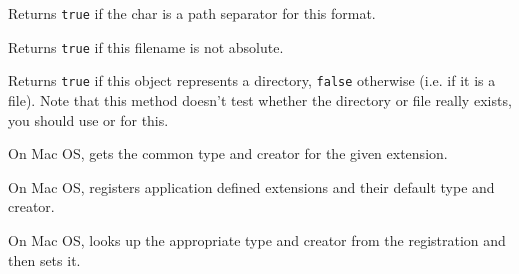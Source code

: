 \label{wxfilenameispathseparator}


Returns {\tt true} if the char is a path separator for this format.


\label{wxfilenameisrelative}


Returns {\tt true} if this filename is not absolute.


\label{wxfilenameisdir}


Returns {\tt true} if this object represents a directory, {\tt false} otherwise
(i.e. if it is a file). Note that this method doesn't test whether the
directory or file really exists, you should use 
 or 
 for this.

\label{wxfilenamemacfinddefaulttypeandcreator}


On Mac OS, gets the common type and creator for the given extension.

\label{wxfilenamemacregisterdefaulttypeandcreator}


On Mac OS, registers application defined extensions and their default type and creator.

\label{wxfilenamemacsetdefaulttypeandcreator}


On Mac OS, looks up the appropriate type and creator from the registration and then sets it.

\label{wxfilenamemakeabsolute}


